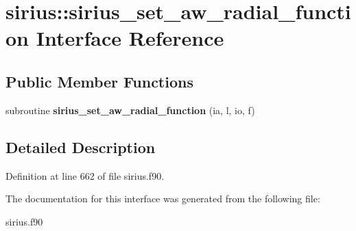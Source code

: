 \hypertarget{interfacesirius_1_1sirius__set__aw__radial__function}{}\section{sirius\+:\+:sirius\+\_\+set\+\_\+aw\+\_\+radial\+\_\+function Interface Reference}
\label{interfacesirius_1_1sirius__set__aw__radial__function}
\subsection*{Public Member Functions}
\begin{DoxyCompactItemize}
\item 
\hypertarget{interfacesirius_1_1sirius__set__aw__radial__function_a92c3376b16a7b10e775f7a52f824d025}{}subroutine {\bfseries sirius\+\_\+set\+\_\+aw\+\_\+radial\+\_\+function} (ia, l, io, f)\label{interfacesirius_1_1sirius__set__aw__radial__function_a92c3376b16a7b10e775f7a52f824d025}

\end{DoxyCompactItemize}


\subsection{Detailed Description}


Definition at line 662 of file sirius.\+f90.



The documentation for this interface was generated from the following file\+:\begin{DoxyCompactItemize}
\item 
sirius.\+f90\end{DoxyCompactItemize}
